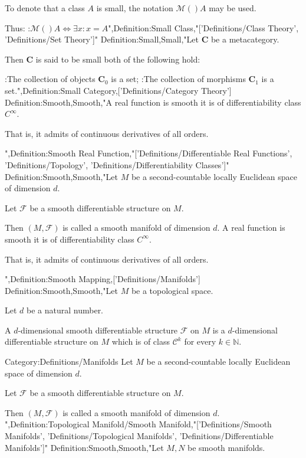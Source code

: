 To denote that a class $A$ is small, the notation $\mathcal M \left(   \right)A$ may be used.

Thus:
:$\mathcal M \left(   \right)A \iff \exists x: x = A$",Definition:Small Class,"['Definitions/Class Theory', 'Definitions/Set Theory']"
Definition:Small,Small,"Let $\mathbf C$ be a metacategory.


Then $\mathbf C$ is said to be small  both of the following hold:

:The collection of objects $\mathbf C_0$ is a set;
:The collection of morphisms $\mathbf C_1$ is a set.",Definition:Small Category,['Definitions/Category Theory']
Definition:Smooth,Smooth,"A real function is smooth  it is of differentiability class $C^\infty$.

That is,  it admits of continuous derivatives of all orders.


",Definition:Smooth Real Function,"['Definitions/Differentiable Real Functions', 'Definitions/Topology', 'Definitions/Differentiability Classes']"
Definition:Smooth,Smooth,"Let $M$ be a second-countable locally Euclidean space of dimension $d$. 

Let $\mathscr F$ be a smooth differentiable structure on $M$.


Then $\left( M, \mathscr F \right)$ is called a smooth manifold of dimension $d$.
A real function is smooth  it is of differentiability class $C^\infty$.

That is,  it admits of continuous derivatives of all orders.



",Definition:Smooth Mapping,['Definitions/Manifolds']
Definition:Smooth,Smooth,"Let $M$ be a topological space.

Let $d$ be a natural number.


A $d$-dimensional smooth differentiable structure $\mathscr F$ on $M$ is a $d$-dimensional differentiable structure on $M$ which is of class $\mathcal C^k$ for every $k \in \mathbb N$.

Category:Definitions/Manifolds
Let $M$ be a second-countable locally Euclidean space of dimension $d$. 

Let $\mathscr F$ be a smooth differentiable structure on $M$.


Then $\left( M, \mathscr F \right)$ is called a smooth manifold of dimension $d$.
",Definition:Topological Manifold/Smooth Manifold,"['Definitions/Smooth Manifolds', 'Definitions/Topological Manifolds', 'Definitions/Differentiable Manifolds']"
Definition:Smooth,Smooth,"Let $M, N$ be smooth manifolds. 

